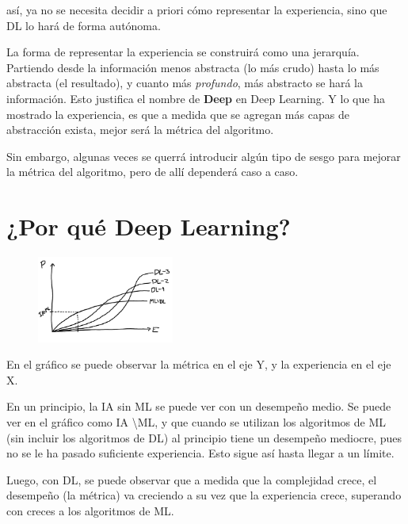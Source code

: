 así, ya no se necesita decidir a priori cómo representar la experiencia, sino que DL lo hará de forma autónoma.

La forma de representar la experiencia se construirá como una jerarquía. Partiendo desde la información menos abstracta (lo más crudo) hasta lo más abstracta (el resultado), y cuanto más \textit{profundo}, más abstracto se hará la información. Esto justifica el nombre de \textbf{Deep} en Deep Learning. Y lo que ha mostrado la experiencia, es que a medida que se agregan más capas de abstracción exista, mejor será la métrica del algoritmo.

Sin embargo, algunas veces se querrá introducir algún tipo de sesgo para mejorar la métrica del algoritmo, pero de allí dependerá caso a caso.

\section{¿Por qué Deep Learning?}

\begin{figure}
  \begin{center}
    \includegraphics[width=0.4\textwidth]{img/img004.png}
  \end{center}
\end{figure}

En el gráfico se puede observar la métrica en el eje Y, y la experiencia en el eje X.

En un principio, la IA sin ML se puede ver con un desempeño medio. Se puede ver en el gráfico como IA \textbackslash ML, y que cuando se utilizan los algoritmos de ML (sin incluir los algoritmos de DL) al principio tiene un desempeño mediocre, pues no se le ha pasado suficiente experiencia. Esto sigue así hasta llegar a un límite.

Luego, con DL, se puede observar que a medida que la complejidad crece, el desempeño (la métrica) va creciendo a su vez que la experiencia crece, superando con creces a los algoritmos de ML.









